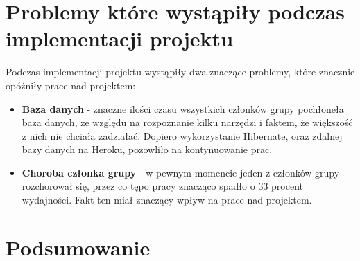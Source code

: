 \documentclass[a4paper,11pt]{uzreport}
\begin{document}
\section{Problemy które wystąpiły podczas implementacji projektu}
Podczas implementacji projektu wystąpiły dwa znaczące problemy, które znacznie opóźniły prace nad projektem: 
    \begin{itemize}[leftmargin=0.50in]
    
        \item \textbf{Baza danych} - znaczne ilości czasu wszystkich członków grupy pochłoneła baza danych, ze względu na rozpoznanie kilku narzędzi i faktem, że 	większość z nich nie chciała zadziałać. Dopiero wykorzystanie Hibernate, oraz zdalnej bazy danych na Heroku, pozowliło na kontynuowanie prac. 
        
        \item \textbf{Choroba członka grupy} - w pewnym momencie jeden z członków grupy rozchorował się, przez co tępo pracy znacząco spadło o 33 procent 			wydajności. Fakt ten miał znaczący wpływ na prace nad projektem.
        
    \end{itemize}

\section{Podsumowanie}
\end{document}
